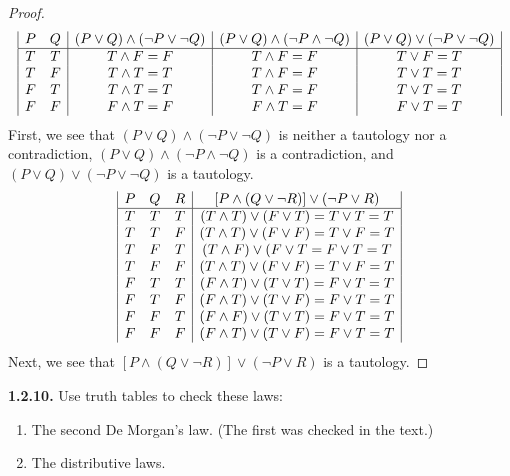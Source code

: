\documentclass[12pt]{amsart}
\newenvironment{statement}[1]{\smallskip\noindent\color[rgb]{.6627, .3529, .6314} {\bf #1.}}{}
\theoremstyle{definition}
\theoremstyle{remark}
\begin{document}
\begin{proof}
\begin{equation*}
	\begin{array}{| c c | c | c | c |}
		P & Q & (P \vee Q) \wedge (\neg P \vee \neg Q) 
		& (P \vee Q) \wedge (\neg P \wedge \neg Q)
		& (P \vee Q) \vee (\neg P \vee \neg Q) \\
		\hline
		T & T & T \wedge F = F & T \wedge F = F & T \vee F = T \\
		T & F & T \wedge T = T & T \wedge F = F & T \vee T = T \\
		F & T & T \wedge T = T & T \wedge F = F & T \vee T = T \\
		F & F & F \wedge T = F & F \wedge T = F & F \vee T = T
	\end{array}
\end{equation*}
First, we see that $(P \vee Q) \wedge (\neg P \vee \neg Q)$ is neither a tautology nor a contradiction, $(P \vee Q) \wedge (\neg P \wedge \neg Q)$ is a contradiction, and $(P \vee Q) \vee (\neg P \vee \neg Q)$ is a tautology.
\begin{equation*}
	\begin{array}{| c c c | c |}
		P & Q & R & [P \wedge (Q \vee \neg R)] \vee (\neg P \vee R) \\
		\hline
		T & T & T & (T \wedge T)  \vee (F \vee T) = T \vee T = T \\
		T & T & F & (T \wedge T) \vee (F \vee F) = T \vee F = T \\
		T & F & T & (T \wedge F) \vee (F \vee T = F \vee T = T \\
		T & F & F & (T \wedge T) \vee (F \vee F) = T \vee F = T \\
		F & T & T & (F \wedge T) \vee (T \vee T) = F \vee T = T \\
		F & T & F & (F \wedge T) \vee (T \vee F) = F \vee T = T \\
		F & F & T & (F \wedge F) \vee (T \vee T) = F \vee T = T \\
		F & F & F & (F \wedge T) \vee (T \vee F) = F \vee T = T
	\end{array}
\end{equation*}
Next, we see that $[P \wedge (Q \vee \neg R)] \vee (\neg P \vee R)$ is a tautology.
\end{proof}


\begin{statement}{1.2.10}
Use truth tables to check these laws:
\begin{enumerate}
	\item The second De Morgan's law.
	(The first was checked in the text.)
	
	\item The distributive laws.
\end{enumerate}
\end{statement}
\end{document}
